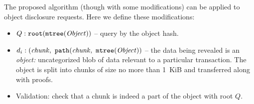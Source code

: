 The proposed algorithm (though with some modifications) can be applied to object disclosure requests. Here we define these modifications:
\begin{itemize}
  \item $Q: \mathtt{root}(\mathtt{mtree}(\mathit{Object}))$ -- query by the object hash.
  \item $d_i: (\mathit{chunk},\ \Path(\mathit{chunk},\ \MerkleTree(\mathit{Object}))$ -- the data being revealed is an \textit{object:} uncategorized blob of data relevant to a particular transaction. The object is split into chunks of size no more than 1~KiB and transferred along with proofs.
  \item Validation: check that a chunk is indeed a part of the object with root $Q$.
\end{itemize}
